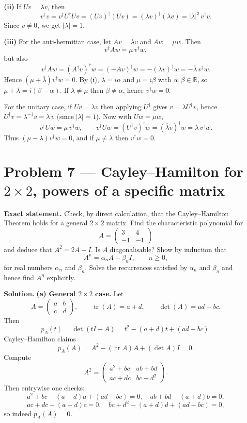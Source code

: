 \documentclass[12pt,a4paper]{article}
\DeclareMathOperator{\tr}{tr}
\theoremstyle{plain}
\theoremstyle{definition}      %
\begin{document}
\textbf{(ii)} If $Uv=\lambda v$, then
\[
v^\dagger v = v^\dagger U^\dagger U v = (Uv)^\dagger(Uv)
=(\lambda v)^\dagger(\lambda v)=|\lambda|^2\, v^\dagger v.
\]
Since $v\neq 0$, we get $|\lambda|=1$.

\textbf{(iii)} For the anti-hermitian case, let $Av=\lambda v$ and $Aw=\mu w$. Then
\[
v^\dagger Aw=\mu\, v^\dagger w,
\]
but also
\[
v^\dagger Aw=(A^\dagger v)^\dagger w = (-Av)^\dagger w = -(\lambda v)^\dagger w
= -\overline{\lambda}\, v^\dagger w.
\]
Hence $(\mu+\overline{\lambda})v^\dagger w=0$. By (i), $\lambda=i\alpha$ and $\mu=i\beta$ with
$\alpha,\beta\in\mathbb R$, so $\mu+\overline{\lambda}=i(\beta-\alpha)$. If $\lambda\neq \mu$ then
$\beta\neq \alpha$, hence $v^\dagger w=0$.

For the unitary case, if $Uv=\lambda v$ then applying $U^\dagger$ gives
$v=\lambda U^\dagger v$, hence $U^\dagger v=\lambda^{-1}v=\overline{\lambda}\,v$ (since $|\lambda|=1$).
Now with $Uw=\mu w$,
\[
v^\dagger Uw=\mu\, v^\dagger w,
\qquad
v^\dagger Uw=(U^\dagger v)^\dagger w=(\overline{\lambda}v)^\dagger w=\lambda\, v^\dagger w.
\]
Thus $(\mu-\lambda)v^\dagger w=0$, and if $\mu\neq\lambda$ then $v^\dagger w=0$.

\section*{Problem 7 — Cayley--Hamilton for $2\times 2$, powers of a specific matrix}

\textbf{Exact statement.}
Check, by direct calculation, that the Cayley--Hamilton Theorem holds for a general $2\times 2$ matrix.
Find the characteristic polynomial for
\[
A=\begin{pmatrix}3&4\\-1&-1\end{pmatrix}
\]
and deduce that $A^2=2A-I$. Is $A$ diagonalisable?
Show by induction that
\[
A^n=\alpha_n A+\beta_n I,\qquad n\ge 0,
\]
for real numbers $\alpha_n$ and $\beta_n$.
Solve the recurrences satisfied by $\alpha_n$ and $\beta_n$ and hence find $A^n$ explicitly.

\textbf{Solution.}
\textbf{(a) General $2\times 2$ case.}
Let
\[
A=\begin{pmatrix}a&b\\c&d\end{pmatrix},\qquad \tr(A)=a+d,\qquad \det(A)=ad-bc.
\]
Then
\[
p_A(t)=\det(tI-A)=t^2-(a+d)t+(ad-bc).
\]
Cayley--Hamilton claims
\[
p_A(A)=A^2-(\tr A)A+(\det A)I=0.
\]
Compute
\[
A^2=\begin{pmatrix}a^2+bc&ab+bd\\ac+dc&bc+d^2\end{pmatrix}.
\]
Then entrywise one checks:
\[
a^2+bc-(a+d)a+(ad-bc)=0,\quad ab+bd-(a+d)b=0,
\]
\[
ac+dc-(a+d)c=0,\quad bc+d^2-(a+d)d+(ad-bc)=0,
\]
so indeed $p_A(A)=0$.
\end{document}
